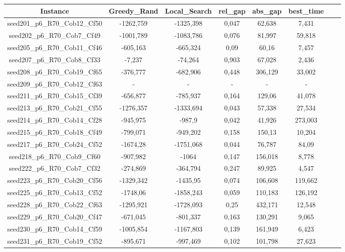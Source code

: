 \documentclass[a4paper]{article}
\begin{document}
\begin{center}
\begin{longtable}{cccccccc}
\tabularnewline
\hline
Instance & Greedy\_Rand & Local\_Search & rel\_gap & abs\_gap & best\_time\\
\hline
seed201\_p6\_R70\_Cob12\_Cf50 & -1262,759 & -1325,398 & 0,047 & 62,638 & 7,431\\
\hline
seed202\_p6\_R70\_Cob7\_Cf49 & -1001,789 & -1083,786 & 0,076 & 81,997 & 59,818\\
\hline
seed205\_p6\_R70\_Cob11\_Cf46 & -605,163 & -665,324 & 0,09 & 60,16 & 7,457\\
\hline
seed207\_p6\_R70\_Cob8\_Cf33 & -7,237 & -74,264 & 0,903 & 67,028 & 2,436\\
\hline
seed208\_p6\_R70\_Cob19\_Cf65 & -376,777 & -682,906 & 0,448 & 306,129 & 33,002\\
\hline
seed209\_p6\_R70\_Cob12\_Cf63 & - & - & - & - & -\\
\hline
seed211\_p6\_R70\_Cob15\_Cf39 & -656,877 & -785,937 & 0,164 & 129,06 & 41,078\\
\hline
seed213\_p6\_R70\_Cob21\_Cf55 & -1276,357 & -1333,694 & 0,043 & 57,338 & 27,534\\
\hline
seed214\_p6\_R70\_Cob14\_Cf28 & -945,975 & -987,9 & 0,042 & 41,926 & 273,003\\
\hline
seed215\_p6\_R70\_Cob18\_Cf49 & -799,071 & -949,202 & 0,158 & 150,13 & 10,204\\
\hline
seed217\_p6\_R70\_Cob24\_Cf52 & -1674,28 & -1751,068 & 0,044 & 76,787 & 84,09\\
\hline
seed218\_p6\_R70\_Cob9\_Cf60 & -907,982 & -1064 & 0,147 & 156,018 & 8,778\\
\hline
seed222\_p6\_R70\_Cob7\_Cf32 & -274,869 & -364,794 & 0,247 & 89,925 & 4,547\\
\hline
seed223\_p6\_R70\_Cob20\_Cf56 & -1329,342 & -1435,95 & 0,074 & 106,608 & 119,662\\
\hline
seed225\_p6\_R70\_Cob13\_Cf52 & -1748,06 & -1858,243 & 0,059 & 110,183 & 126,192\\
\hline
seed228\_p6\_R70\_Cob22\_Cf63 & -1295,921 & -1728,093 & 0,25 & 432,171 & 12,548\\
\hline
seed229\_p6\_R70\_Cob20\_Cf47 & -671,045 & -801,337 & 0,163 & 130,291 & 9,065\\
\hline
seed230\_p6\_R70\_Cob14\_Cf59 & -1005,854 & -1167,803 & 0,139 & 161,949 & 6,423\\
\hline
seed231\_p6\_R70\_Cob19\_Cf52 & -895,671 & -997,469 & 0,102 & 101,798 & 27,623\\

\end{longtable}
\end{center}
\end{document}
